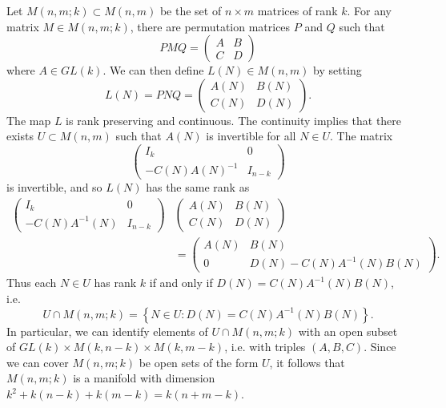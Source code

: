 \begin{example}
    Let $M(n,m;k) \subset M(n,m)$ be the set of $n \times m$ matrices of rank $k$. For any matrix $M \in M(n,m;k)$, there are permutation matrices $P$ and $Q$ such that
    \[ PMQ = \begin{pmatrix} A & B \\ C & D \end{pmatrix} \]
    where $A \in GL(k)$. We can then define $L(N) \in M(n,m)$ by setting
    \[ L(N) = PNQ = \begin{pmatrix} A(N) & B(N) \\ C(N) & D(N) \end{pmatrix}. \]
    The map $L$ is rank preserving and continuous. The continuity implies that there exists $U \subset M(n,m)$ such that $A(N)$ is invertible for all $N \in U$. The matrix
    \[ \begin{pmatrix} I_k & 0 \\ -C(N)A(N)^{-1} & I_{n-k} \end{pmatrix} \]
    is invertible, and so $L(N)$ has the same rank as
    \begin{align*}
        \begin{pmatrix} I_k & 0 \\ -C(N)A^{-1}(N) & I_{n-k} \end{pmatrix} &\begin{pmatrix} A(N) & B(N) \\ C(N) & D(N) \end{pmatrix}\\
        &= \begin{pmatrix} A(N) & B(N) \\ 0 & D(N) - C(N)A^{-1}(N)B(N) \end{pmatrix}.
    \end{align*}
    Thus each $N \in U$ has rank $k$ if and only if $D(N) = C(N)A^{-1}(N)B(N)$, i.e.
    \[ U \cap M(n,m;k) = \left\{ N \in U : D(N) = C(N) A^{-1}(N) B(N) \right\}. \]
    In particular, we can identify elements of $U \cap M(n,m;k)$ with an open subset of $GL(k) \times M(k,n-k) \times M(k,m-k)$, i.e. with triples $(A,B,C)$. Since we can cover $M(n,m;k)$ be open sets of the form $U$, it follows that $M(n,m;k)$ is a manifold with dimension $k^2 + k(n-k) + k(m-k) = k(n+m-k)$.
\end{example}


